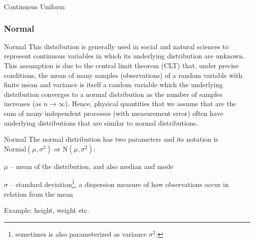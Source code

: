 \begin{frame}[noframenumbering]{Continuous Uniform}
	\centering
\end{frame}

\subsubsection*{Normal}
\begin{frame}[noframenumbering]{Normal}
	This distribution is generally used in social and natural sciences to
	represent continuous variables in which its underlying distribution are unknown.
	This assumption is due to the central limit theorem (CLT) that,
	under precise conditions, the mean of many samples (observations) of a
	random variable with finite mean and variance is itself a random variable
	which the underlying distribution converges to a normal distribution
	as the number of samples increases (as $n \to \infty$).
	\vfill
	Hence, physical quantities that we assume that are the sum of many
	independent processes (with measurement error) often have underlying
	distributions that are similar to normal distributions.
\end{frame}

\begin{frame}[noframenumbering]{Normal}
	The normal distribution has two parameters and its notation is
	$\text{Normal}(\mu, \sigma^2)$ or $\text{N}(\mu, \sigma^2)$:
	\begin{vfilleditems}
		\item $\mu$ -- mean of the distribution, and also median and mode
		\item $\sigma$ -- standard deviation\footnote{sometimes is also parameterized as variance $\sigma^2$.},
		a dispersion measure of how observations occur in relation from the mean
	\end{vfilleditems}
	\vfill
	Example: height, weight etc.
\end{frame}

